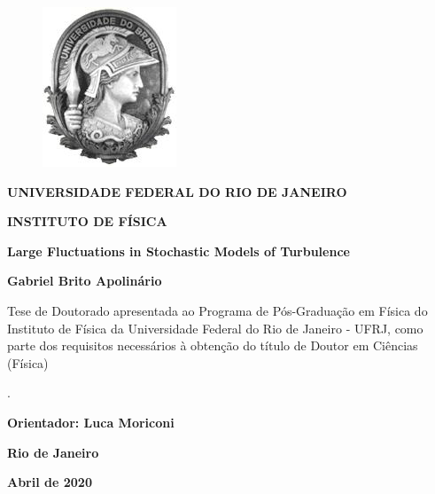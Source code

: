 \documentclass[brazil,12pt,a4paper,openany]{book}
\begin{document}
\setlength{\abovecaptionskip}{0.0cm}
\setlength{\belowcaptionskip}{0.0cm}
\setlength{\baselineskip}{24pt}

\pagestyle{fancy}
\lhead{}
\chead{}
\rhead{\thepage}
\lfoot{}
\cfoot{}
\rfoot{}

{
	\fancyhf{}
	\lhead{}
	\chead{}
	\rhead{\thepage}
	\lfoot{}
	\cfoot{}
	\rfoot{}
}

\renewcommand{\headrulewidth}{0pt}




\frontmatter

\thispagestyle{empty}

\begin{figure}[h]
	\includegraphics[scale=0.8]{logo_ufrj.jpg}
\end{figure}

\vspace{15pt}

\begin{center}

\textbf{UNIVERSIDADE FEDERAL DO RIO DE JANEIRO}

\textbf{INSTITUTO DE FÍSICA}

\vspace{30pt}

{\Large \bf Large Fluctuations in Stochastic Models of Turbulence}

\vspace{25pt}

{\large \bf Gabriel Brito Apolinário}

\vspace{35pt}

\begin{flushright}
\parbox{10.3cm}{Tese de Doutorado apresentada ao Programa de Pós-Graduação em Física do Instituto de Física da Universidade Federal do Rio de Janeiro - UFRJ, como parte dos requisitos necessários à obtenção do título de Doutor em Ciências (Física)}.

\vspace{18pt}

{\large \bf Orientador: Luca Moriconi}


\end{flushright}

\vspace{90pt}

\textbf{Rio de Janeiro}

\textbf{Abril de 2020}

\end{center}
\end{document}
